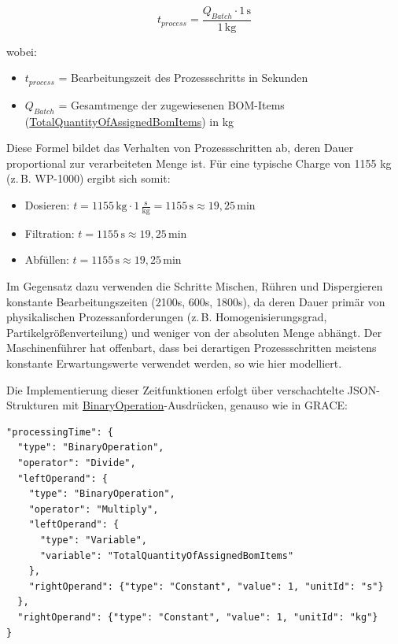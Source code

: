 \begin{equation}
t_{process} = \frac{Q_{Batch} \cdot 1\,\text{s}}{1\,\text{kg}}
\label{eq:mengenabhaengig}
\end{equation}

wobei:
\begin{itemize}
    \item $t_{process}$ = Bearbeitungszeit des Prozessschritts in Sekunden
    \item $Q_{Batch}$ = Gesamtmenge der zugewiesenen BOM-Items (\url{TotalQuantityOfAssignedBomItems}) in kg
\end{itemize}

\noindent Diese Formel bildet das Verhalten von Prozessschritten ab, deren Dauer proportional zur verarbeiteten Menge ist. Für eine typische Charge von 1155 kg (z.\,B. WP-1000) ergibt sich somit:

\begin{itemize}
    \item Dosieren: $t = 1155\,\text{kg} \cdot 1\,\frac{\text{s}}{\text{kg}} = 1155\,\text{s} \approx 19,25\,\text{min}$
    \item Filtration: $t = 1155\,\text{s} \approx 19,25\,\text{min}$
    \item Abfüllen: $t = 1155\,\text{s} \approx 19,25\,\text{min}$
\end{itemize}

\noindent Im Gegensatz dazu verwenden die Schritte Mischen, Rühren und Dispergieren konstante Bearbeitungszeiten (2100s, 600s, 1800s), da deren Dauer primär von physikalischen Prozessanforderungen (z.\,B. Homogenisierungsgrad, Partikelgrößenverteilung) und weniger von der absoluten Menge abhängt. Der Maschinenführer hat offenbart, dass bei derartigen Prozessschritten meistens konstante Erwartungswerte verwendet werden, so wie hier modelliert. 

\noindent Die Implementierung dieser Zeitfunktionen erfolgt über verschachtelte JSON-Strukturen mit \url{BinaryOperation}-Ausdrücken, genauso wie in GRACE:

\begin{verbatim}
"processingTime": {
  "type": "BinaryOperation",
  "operator": "Divide",
  "leftOperand": {
    "type": "BinaryOperation",
    "operator": "Multiply",
    "leftOperand": {
      "type": "Variable",
      "variable": "TotalQuantityOfAssignedBomItems"
    },
    "rightOperand": {"type": "Constant", "value": 1, "unitId": "s"}
  },
  "rightOperand": {"type": "Constant", "value": 1, "unitId": "kg"}
}
\end{verbatim}

